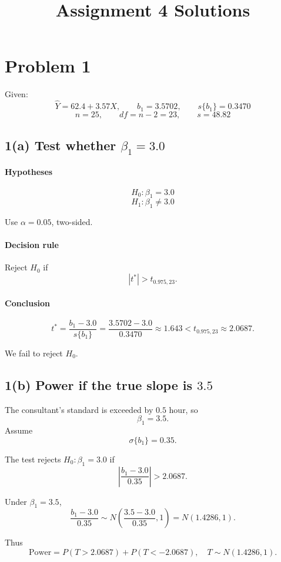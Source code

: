 \documentclass[11pt]{article}
\begin{document}
\title{Assignment 4 Solutions}
\author{}
\date{}
\maketitle

\section*{Problem 1}

Given:
\[
\hat Y=62.4+3.57X,\qquad b_1=3.5702,\qquad s\{b_1\}=0.3470
\]
\[
n=25,\qquad df=n-2=23,\qquad s=48.82
\]

\subsection*{1(a) Test whether \(\beta_1=3.0\)}

\paragraph{Hypotheses}
\[
H_0:\beta_1=3.0
\]
\[
H_1:\beta_1\ne 3.0
\]

Use \(\alpha=0.05\), two-sided.

\paragraph{Decision rule}
Reject \(H_0\) if
\[
|t^*|>t_{0.975,23}.
\]

\paragraph{Conclusion}
\[
t^*=\frac{b_1-3.0}{s\{b_1\}}
=\frac{3.5702-3.0}{0.3470}
\approx 1.643
< t_{0.975,23}\approx 2.0687.
\]

We fail to reject \(H_0\).

\subsection*{1(b) Power if the true slope is \(3.5\)}

The consultant's standard is exceeded by \(0.5\) hour, so
\[
\beta_1=3.5.
\]
Assume
\[
\sigma\{b_1\}=0.35.
\]

The test rejects \(H_0:\beta_1=3.0\) if
\[
\left|\frac{b_1-3.0}{0.35}\right|>2.0687.
\]

Under \(\beta_1=3.5\),
\[
\frac{b_1-3.0}{0.35}\sim N\left(\frac{3.5-3.0}{0.35},1\right)
=N(1.4286,1).
\]

Thus
\[
\text{Power}
=P(T>2.0687)+P(T<-2.0687),
\quad T\sim N(1.4286,1).
\]
\end{document}
